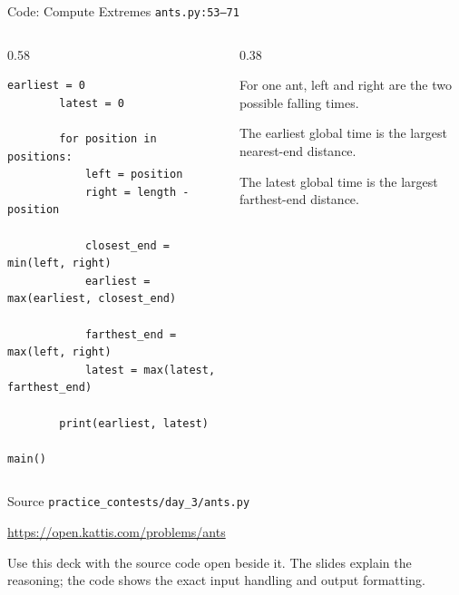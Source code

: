 \documentclass[aspectratio=169,11pt]{beamer}
\begin{document}
\begin{frame}[fragile]{Code: Compute Extremes}
\scriptsize
{} \texttt{ants.py:53--71}

\vspace{0.08cm}
\begin{columns}[T,totalwidth=\textwidth]
\begin{column}{0.58\textwidth}
\begin{lstlisting}[style=cpcode]
        earliest = 0
        latest = 0

        for position in positions:
            left = position
            right = length - position

            closest_end = min(left, right)
            earliest = max(earliest, closest_end)

            farthest_end = max(left, right)
            latest = max(latest, farthest_end)

        print(earliest, latest)

main()
\end{lstlisting}
\end{column}
\begin{column}{0.38\textwidth}
\begin{tightitemize}
  \item For one ant, left and right are the two possible falling times.
  \item The earliest global time is the largest nearest-end distance.
  \item The latest global time is the largest farthest-end distance.
\end{tightitemize}
\end{column}
\end{columns}
\end{frame}

\begin{frame}{Source}
\small
{} \texttt{practice\_contests/day\_3/ants.py}

\vspace{0.3cm}
 \url{https://open.kattis.com/problems/ants}

\vspace{0.45cm}
Use this deck with the source code open beside it. The slides explain the reasoning; the code shows the exact input handling and output formatting.
\end{frame}
\end{document}
